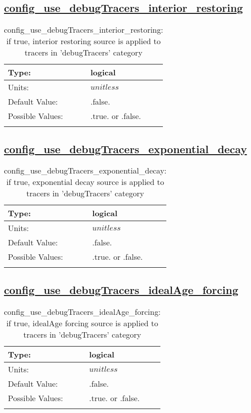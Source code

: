 \subsection[config\_use\_debugTracers\_interior\_restoring]{\hyperref[sec:nm_tab_tracer_forcing_debugTracers]{config\_use\_debugTracers\_interior\_restoring}}
\label{subsec:nm_sec_config_use_debugTracers_interior_restoring}
\begin{center}
\begin{longtable}{| p{2.0in} || p{4.0in} |}
    \hline
    Type: & logical \\
    \hline
    Units: & $unitless$ \\
    \hline
    Default Value: & .false. \\
    \hline
    Possible Values: & .true. or .false. \\
    \hline
    \caption{config\_use\_debugTracers\_interior\_restoring: if true, interior restoring source is applied to tracers in 'debugTracers' category}
\end{longtable}
\end{center}
\subsection[config\_use\_debugTracers\_exponential\_decay]{\hyperref[sec:nm_tab_tracer_forcing_debugTracers]{config\_use\_debugTracers\_exponential\_decay}}
\label{subsec:nm_sec_config_use_debugTracers_exponential_decay}
\begin{center}
\begin{longtable}{| p{2.0in} || p{4.0in} |}
    \hline
    Type: & logical \\
    \hline
    Units: & $unitless$ \\
    \hline
    Default Value: & .false. \\
    \hline
    Possible Values: & .true. or .false. \\
    \hline
    \caption{config\_use\_debugTracers\_exponential\_decay: if true, exponential decay source is applied to tracers in 'debugTracers' category}
\end{longtable}
\end{center}
\subsection[config\_use\_debugTracers\_idealAge\_forcing]{\hyperref[sec:nm_tab_tracer_forcing_debugTracers]{config\_use\_debugTracers\_idealAge\_forcing}}
\label{subsec:nm_sec_config_use_debugTracers_idealAge_forcing}
\begin{center}
\begin{longtable}{| p{2.0in} || p{4.0in} |}
    \hline
    Type: & logical \\
    \hline
    Units: & $unitless$ \\
    \hline
    Default Value: & .false. \\
    \hline
    Possible Values: & .true. or .false. \\
    \hline
    \caption{config\_use\_debugTracers\_idealAge\_forcing: if true, idealAge forcing source is applied to tracers in 'debugTracers' category}
\end{longtable}
\end{center}
